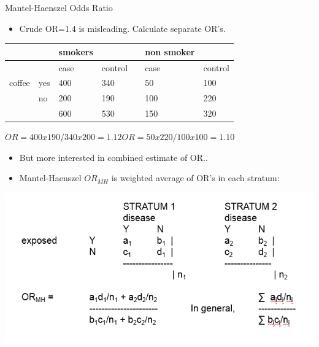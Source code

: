 \documentclass[ignorenonframetext,]{beamer}
\begin{document}
\begin{frame}{Mantel-Haenszel Odds Ratio}

\begin{itemize}
\itemsep1pt\parskip0pt
\item
  Crude OR=1.4 is misleading. Calculate separate OR's.
\end{itemize}

\begin{longtable}[c]{@{}lllllll@{}}
\toprule
& & smokers & & & non smoker &\tabularnewline
\midrule
\endhead
& & case & control & & case & control\tabularnewline
coffee & yes & 400 & 340 & & 50 & 100\tabularnewline
& no & 200 & 190 & & 100 & 220\tabularnewline
& & 600 & 530 & & 150 & 320\tabularnewline
\bottomrule
\end{longtable}

\(OR = 400x190/340x200 = 1.12 OR = 50x220/100x100 = 1.10\)

\begin{itemize}
\itemsep1pt\parskip0pt
\item
  But more interested in combined estimate of OR..
\end{itemize}

\end{frame}

\begin{frame}

\begin{itemize}
\itemsep1pt\parskip0pt
\item
  Mantel-Haenszel \(OR_{MH}\) is weighted average of OR's in each
  stratum:
\end{itemize}

\includegraphics{stratum.png}

\end{frame}
\end{document}
